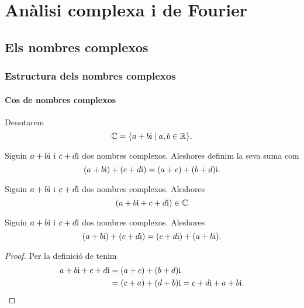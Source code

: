 \documentclass[../../Main.tex]{subfiles}
\begin{document}
\part{Anàlisi complexa i de Fourier}
\chapter{Els nombres complexos}
\section{Estructura dels nombres complexos}
	\subsection{Cos de nombres complexos}
	\begin{notation}
		\label{notation:cos de nombres complexos}
		Denotarem
		\[\mathbb{C}=\{a+b\mathrm{i}\mid a,b\in\mathbb{R}\}.\]
	\end{notation}
	\begin{definition}
		\label{def:suma de nombres complexos}
		Siguin \(a+b\mathrm{i}\) i \(c+d\mathrm{i}\) dos nombres complexos. Aleshores definim la seva suma com
		\[(a+b\mathrm{i})+(c+d\mathrm{i})=(a+c)+(b+d)\mathrm{i}.\]
	\end{definition}
	\begin{observation}
		\label{obs:els nombres complexos estan tancats per la suma}
		Siguin \(a+b\mathrm{i}\) i \(c+d\mathrm{i}\) dos nombres complexos. Aleshores
		\[(a+b\mathrm{i}+c+d\mathrm{i})\in\mathbb{C}\]
	\end{observation}
	\begin{proposition}
		\label{prop:els nombres complexos commuten per la suma}
		Siguin \(a+b\mathrm{i}\) i \(c+d\mathrm{i}\) dos nombres complexos. Aleshores
		\[(a+b\mathrm{i})+(c+d\mathrm{i})=(c+d\mathrm{i})+(a+b\mathrm{i}).\]
		\begin{proof}
			Per la definició de  tenim
			\begin{align*}
				a+b\mathrm{i}+c+d\mathrm{i}&=(a+c)+(b+d)\mathrm{i} \\
				&=(c+a)+(d+b)\mathrm{i}=c+d\mathrm{i}+a+b\mathrm{i}.\qedhere
			\end{align*}
		\end{proof}
	\end{proposition}
\end{document}
